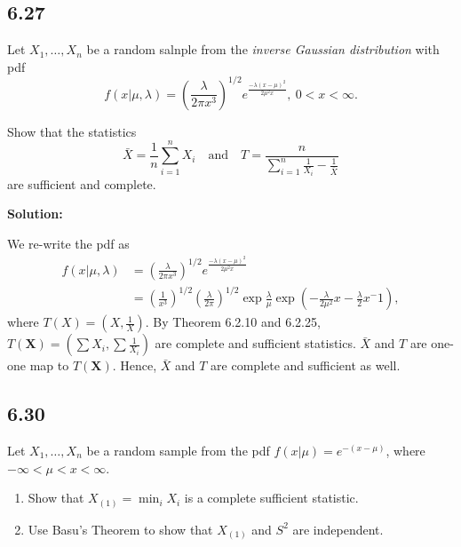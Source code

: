 \documentclass[11pt]{article}
\newcommand{\X}{\mathbf{X}}
\newcommand{\Sol}{\par {\bf Solution:}}
\newcommand{\sample}[1]{#1_1 , \dots , #1_n}
\begin{document}
\subsection*{6.27}
Let $\sample{X}$ be a random salnple from the \emph{inverse Gaussian distribution} with pdf
$$f(x|\mu,\lambda) = (\frac{\lambda}{2\pi x^3})^{1/2}e^{\frac{-\lambda(x-\mu)^2}{2\mu^2x}}, ~ 0 <x < \infty.$$

Show that the statistics
$$\bar X  = \frac{1}{n} \sum \limits_{i=1}^n X_i \quad \textrm{and} \quad T = \frac{n}{\sum _{i=1}^n \frac{1}{X_i} - \frac{1}{\bar X}}$$
are sufficient and complete.

\Sol

We re-write the pdf as
\begin{align*}
    f(x|\mu, \lambda) &= (\frac{\lambda}{2\pi x^3})^{1/2}e^{\frac{-\lambda(x-\mu)^2}{2\mu^2x}} \\
    & = (\frac{1}{x^3})^{1/2} (\frac{\lambda}{2\pi})^{1/2} \exp{\frac{\lambda}{\mu}} \exp{(-\frac{\lambda}{2\mu^2}x - \frac{\lambda}{2}x^-1)},
\end{align*}
where $T(X) = (X, \frac{1}{X})$. By Theorem 6.2.10 and 6.2.25,
$T(\X) = (\sum X_i, \sum \frac{1}{X_i})$ are complete and sufficient statistics. $\bar X$ and $T$ are one-one map to $T(\X)$. Hence, $\bar X$ and $T$ are complete and sufficient as well.

\subsection*{6.30}
Let $\sample{X}$ be a random sample from the pdf $f(x|\mu) = e^{-(x-\mu)}$, where $-\infty < \mu < x < \infty$.
\begin{enumerate}[label=(\alph*)]
    \item Show that $X_{(1)} = \min_i X_i$ is a complete sufficient statistic.
    \item Use Basu's Theorem to show that $X_{(1)}$ and $S^2$ are independent.
\end{enumerate}
\end{document}
